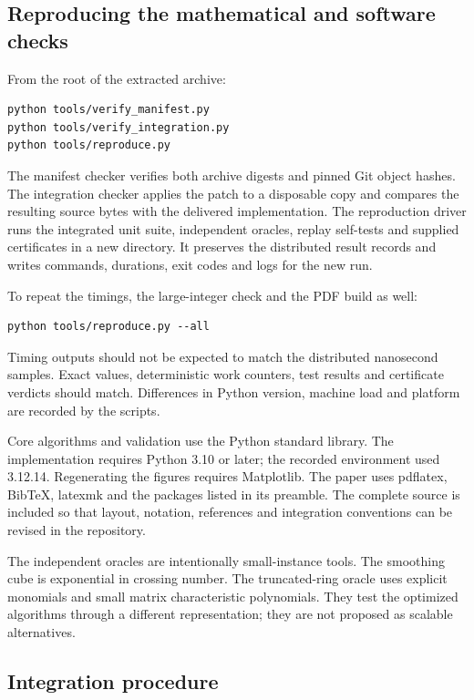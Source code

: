 \subsection{Reproducing the mathematical and software checks}

From the root of the extracted archive:
\begin{lstlisting}
python tools/verify_manifest.py
python tools/verify_integration.py
python tools/reproduce.py
\end{lstlisting}
The manifest checker verifies both archive digests and pinned Git object
hashes. The integration checker applies the patch to a disposable copy and
compares the resulting source bytes with the delivered implementation.
The reproduction driver runs the integrated unit suite, independent
oracles, replay self-tests and supplied certificates in a new directory.
It preserves the distributed result records and writes commands, durations,
exit codes and logs for the new run.

To repeat the timings, the large-integer check and the PDF build as well:
\begin{lstlisting}
python tools/reproduce.py --all
\end{lstlisting}
Timing outputs should not be expected to match the distributed nanosecond
samples. Exact values, deterministic work counters, test results and
certificate verdicts should match. Differences in Python version,
machine load and platform are recorded by the scripts.

Core algorithms and validation use the Python standard library.
The implementation requires Python 3.10 or later; the recorded environment
used 3.12.14. Regenerating the figures requires Matplotlib.
The paper uses pdflatex, BibTeX, latexmk and the packages listed in its
preamble. The complete source is included so that layout, notation,
references and integration conventions can be revised in the repository.

The independent oracles are intentionally small-instance tools.
The smoothing cube is exponential in crossing number. The truncated-ring
oracle uses explicit monomials and small matrix characteristic polynomials.
They test the optimized algorithms through a different representation;
they are not proposed as scalable alternatives.

\subsection{Integration procedure}

